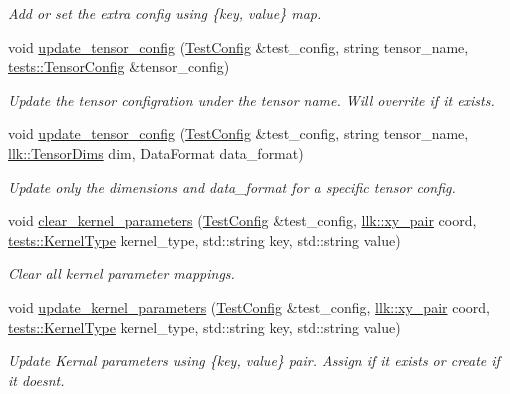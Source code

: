 \begin{DoxyCompactItemize}
\begin{DoxyCompactList}\small\item\em Add or set the extra config using \{key, value\} map. \end{DoxyCompactList}\item 
void \hyperlink{namespacetests_1_1test__config__api_afe5e56a2088573bf1a4ceabb01b2424d}{update\+\_\+tensor\+\_\+config} (\hyperlink{structtests_1_1TestConfig}{Test\+Config} \&test\+\_\+config, string tensor\+\_\+name, \hyperlink{structtests_1_1TensorConfig}{tests\+::\+Tensor\+Config} \&tensor\+\_\+config)
\begin{DoxyCompactList}\small\item\em Update the tensor configration under the tensor name. Will overrite if it exists. \end{DoxyCompactList}\item 
void \hyperlink{namespacetests_1_1test__config__api_a06e47de4d6e6c2de865838ded3f52764}{update\+\_\+tensor\+\_\+config} (\hyperlink{structtests_1_1TestConfig}{Test\+Config} \&test\+\_\+config, string tensor\+\_\+name, \hyperlink{structllk_1_1TensorDims}{llk\+::\+Tensor\+Dims} dim, Data\+Format data\+\_\+format)
\begin{DoxyCompactList}\small\item\em Update only the dimensions and data\+\_\+format for a specific tensor config. \end{DoxyCompactList}\item 
void \hyperlink{namespacetests_1_1test__config__api_acb29a0a49bb5ecb9cd6ca09eb6211ad1}{clear\+\_\+kernel\+\_\+parameters} (\hyperlink{structtests_1_1TestConfig}{Test\+Config} \&test\+\_\+config, \hyperlink{structllk_1_1xy__pair}{llk\+::xy\+\_\+pair} coord, \hyperlink{namespacetests_a4f360b8af533762256ff97513bfd6a0d}{tests\+::\+Kernel\+Type} kernel\+\_\+type, std\+::string key, std\+::string value)
\begin{DoxyCompactList}\small\item\em Clear all kernel parameter mappings. \end{DoxyCompactList}\item 
void \hyperlink{namespacetests_1_1test__config__api_a056c9a76c1c2ac345492adad043a41f1}{update\+\_\+kernel\+\_\+parameters} (\hyperlink{structtests_1_1TestConfig}{Test\+Config} \&test\+\_\+config, \hyperlink{structllk_1_1xy__pair}{llk\+::xy\+\_\+pair} coord, \hyperlink{namespacetests_a4f360b8af533762256ff97513bfd6a0d}{tests\+::\+Kernel\+Type} kernel\+\_\+type, std\+::string key, std\+::string value)
\begin{DoxyCompactList}\small\item\em Update Kernal parameters using \{key, value\} pair. Assign if it exists or create if it doesn\textquotesingle{}t. \end{DoxyCompactList}\item 

\end{DoxyCompactItemize}
